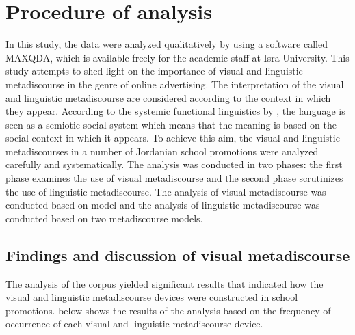 \documentclass[english]{textolivre}
\begin{document}
\section{Procedure of analysis}\label{sec-formato}
In this study, the data were analyzed qualitatively by using a software called MAXQDA, which is available freely for the academic staff at Isra University. This study attempts to shed light on the importance of visual and linguistic metadiscourse in the genre of online advertising. The interpretation of the visual and linguistic metadiscourse are considered according to the context in which they appear. According to the systemic functional linguistics by \textcite{halliday_categories_1961}, the language is seen as a semiotic social system which means that the meaning is based on the social context in which it appears. To achieve this aim, the visual and linguistic metadiscourses in a number of Jordanian school promotions were analyzed carefully and systematically. The analysis was conducted in two phases: the first phase examines the use of visual metadiscourse and the second phase scrutinizes the use of linguistic metadiscourse. The analysis of visual metadiscourse was conducted based on  model and the analysis of linguistic metadiscourse was conducted based on  two metadiscourse models.

\subsection{Findings and discussion of visual metadiscourse}

The analysis of the corpus yielded significant results that indicated how the visual and linguistic metadiscourse devices were constructed in school promotions.  below shows the results of the analysis based on the frequency of occurrence of each visual and linguistic metadiscourse device.
\end{document}
